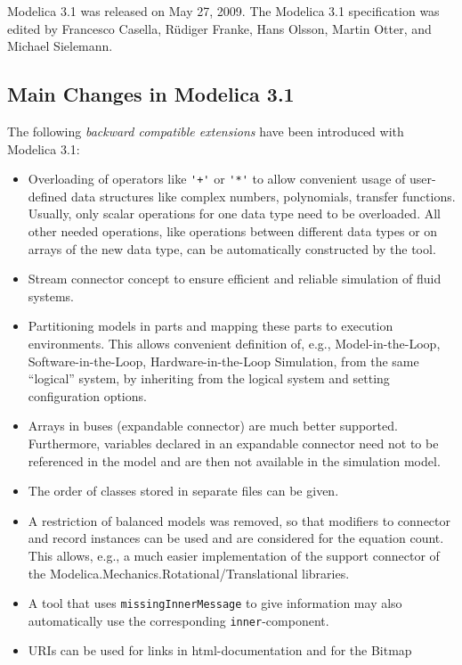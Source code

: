 Modelica 3.1 was released on May 27, 2009. The Modelica 3.1
specification was edited by Francesco Casella, Rüdiger Franke, Hans
Olsson, Martin Otter, and Michael Sielemann.

\subsection{Main Changes in Modelica 3.1}\label{main-changes-in-modelica-3-1}

The following \emph{backward compatible extensions} have been introduced with Modelica 3.1:
\begin{itemize}
\item
  Overloading of operators like \lstinline!'+'! or \lstinline!'*'! to allow convenient usage of
  user-defined data structures like complex numbers, polynomials,
  transfer functions. Usually, only scalar operations for one data type
  need to be overloaded. All other needed operations, like operations
  between different data types or on arrays of the new data type, can be
  automatically constructed by the tool.
\item
  Stream connector concept to ensure efficient and reliable simulation
  of fluid systems.
\item
  Partitioning models in parts and mapping these parts to execution
  environments. This allows convenient definition of, e.g.,
  Model-in-the-Loop, Software-in-the-Loop, Hardware-in-the-Loop
  Simulation, from the same ``logical'' system, by inheriting from the
  logical system and setting configuration options.
\item
  Arrays in buses (expandable connector) are much better supported.
  Furthermore, variables declared in an expandable connector need not to
  be referenced in the model and are then not available in the
  simulation model.
\item
  The order of classes stored in separate files can be given.
\item
  A restriction of balanced models was removed, so that modifiers to
  connector and record instances can be used and are considered for the
  equation count. This allows, e.g., a much easier implementation of the
  support connector of the Modelica.Mechanics.Rotational/Translational
  libraries.
\item
  A tool that uses \lstinline!missingInnerMessage! to give information may also automatically use the corresponding \lstinline!inner!-component.
\item
  URIs can be used for links in html-documentation and for the Bitmap

\end{itemize}
